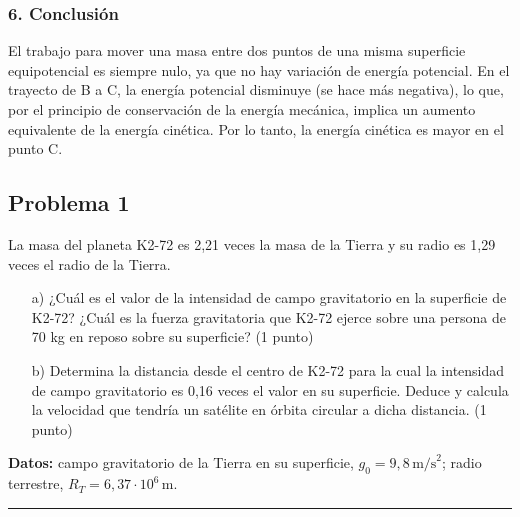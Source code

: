\subsubsection*{6. Conclusión}
\begin{cajaconclusion}
El trabajo para mover una masa entre dos puntos de una misma superficie equipotencial es siempre nulo, ya que no hay variación de energía potencial.
En el trayecto de B a C, la energía potencial disminuye (se hace más negativa), lo que, por el principio de conservación de la energía mecánica, implica un aumento equivalente de la energía cinética. Por lo tanto, la energía cinética es mayor en el punto C.
\end{cajaconclusion}

\newpage

\subsection{Problema 1}
\label{subsec:P1_2021_jun_ord}
\begin{cajaenunciado}
La masa del planeta K2-72 es 2,21 veces la masa de la Tierra y su radio es 1,29 veces el radio de la Tierra.
\begin{enumerate}
    \item[a)] ¿Cuál es el valor de la intensidad de campo gravitatorio en la superficie de K2-72? ¿Cuál es la fuerza gravitatoria que K2-72 ejerce sobre una persona de 70 kg en reposo sobre su superficie? (1 punto)
    \item[b)] Determina la distancia desde el centro de K2-72 para la cual la intensidad de campo gravitatorio es 0,16 veces el valor en su superficie. Deduce y calcula la velocidad que tendría un satélite en órbita circular a dicha distancia. (1 punto)
\end{enumerate}
\textbf{Datos:} campo gravitatorio de la Tierra en su superficie, $g_0=9,8\,\text{m/s}^2$; radio terrestre, $R_T=6,37\cdot10^6\,\text{m}$.
\end{cajaenunciado}
\hrule

